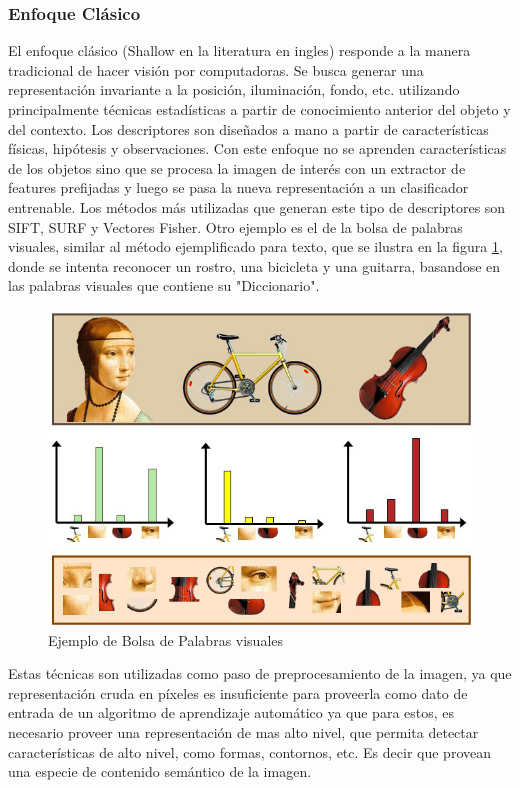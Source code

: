 \documentclass[a4paper,11pt,spanish]{book}
\begin{document}
      \subsubsection{Enfoque Clásico}
	El enfoque clásico (Shallow en la literatura en ingles) responde a la manera tradicional de hacer visión por computadoras. Se busca generar una representación invariante
	a la posición, iluminación, fondo, etc. utilizando principalmente técnicas estadísticas a partir de conocimiento anterior del objeto y del contexto.
	Los descriptores son diseñados a mano a partir de características físicas, hipótesis y observaciones. Con este enfoque no se aprenden características de los objetos sino que
	se procesa la imagen de interés con un extractor de features prefijadas y luego se pasa la nueva representación a un clasificador entrenable.
	Los métodos más utilizadas que generan este tipo de descriptores son SIFT, SURF y Vectores Fisher.
	Otro ejemplo es el de la bolsa de palabras visuales, similar al método ejemplificado para texto, que se ilustra en la figura \ref{fig:bovw}, donde se intenta reconocer un rostro,
	una bicicleta y una guitarra, basandose en las palabras visuales que contiene su "Diccionario".
	\begin{figure}[h]
	  \begin{center}
	    \includegraphics[scale=0.5]{./img/bag_of_visual_words.jpg}
	    \caption{Ejemplo de Bolsa de Palabras visuales}
	    \label{fig:bovw}
	  \end{center}
	\end{figure}

	Estas técnicas son utilizadas como paso de preprocesamiento de la imagen, ya que representación cruda en píxeles es insuficiente para proveerla como dato de entrada de un algoritmo
	de aprendizaje automático ya que para estos, es necesario proveer una representación de mas alto nivel, que permita detectar características de alto nivel,
	como formas, contornos, etc. Es decir que provean una especie de contenido semántico de la imagen.
\end{document}
